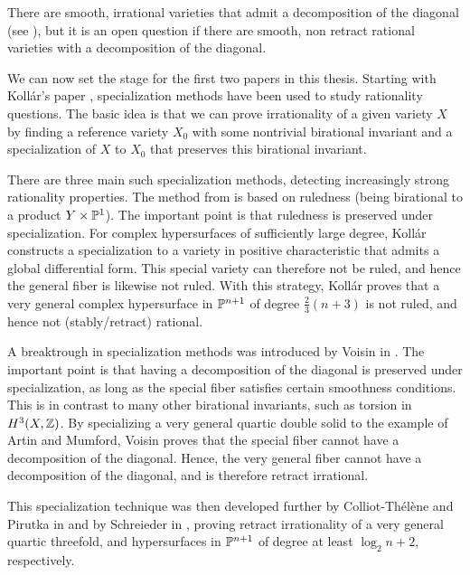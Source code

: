 \begin{remark}
	There are smooth, irrational varieties that admit a decomposition of the diagonal (see \cite{ColliotThelenePresqueDiagonales}), but it is an open question if there are smooth, non retract rational varieties with a decomposition of the diagonal.
\end{remark}

We can now set the stage for the first two papers in this thesis. Starting with Koll\'ar's paper \cite{KollarHypersurfaces}, specialization methods have been used to study rationality questions. The basic idea is that we can prove irrationality of a given variety $X$ by finding a reference variety $X_0$ with some nontrivial birational invariant and a specialization of $X$ to $X_0$ that preserves this birational invariant.

There are three main such specialization methods, detecting increasingly strong rationality properties. The method from \cite{KollarHypersurfaces} is based on ruledness (being birational to a product $Y \times \P^1$). The important point is that ruledness is preserved under specialization. For complex hypersurfaces of sufficiently large degree, Koll\'ar constructs a specialization to a variety in positive characteristic that admits a global differential form. This special variety can therefore not be ruled, and hence the general fiber is likewise not ruled. With this strategy, Koll\'ar proves that a very general complex hypersurface in $\P^{n+1}$ of degree $\frac{2}{3}(n+3)$ is not ruled, and hence not (stably/retract) rational.

A breaktrough in specialization methods was introduced by Voisin in \cite{VoisinDoubleQuartic}. The important point is that having a decomposition of the diagonal is preserved under specialization, as long as the special fiber satisfies certain smoothness conditions. This is in contrast to many other birational invariants, such as torsion in $H^3(X,\Z)$. By specializing a very general quartic double solid to the example of Artin and Mumford, Voisin proves that the special fiber cannot have a decomposition of the diagonal. Hence, the very general fiber cannot have a decomposition of the diagonal, and is therefore retract irrational.

This specialization technique was then developed further by Colliot-Thélène and Pirutka in \cite{ColliotThelenePirutka} and by Schreieder in \cite{SchreiederHypersurface}, proving retract irrationality of a very general quartic threefold, and hypersurfaces in $\P^{n+1}$ of degree at least $\log_2 n + 2$, respectively.

